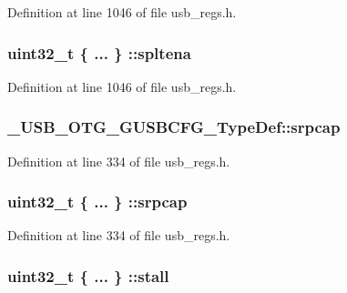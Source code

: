 Definition at line 1046 of file usb\-\_\-regs.\-h.

\hypertarget{group___u_s_b___o_t_g___d_r_i_v_e_r_ga365442084bc841784267d3f360fb62dd}{
\subsubsection[{spltena}]{\setlength{\rightskip}{0pt plus 5cm}uint32\-\_\-t \{ ... \} \-::spltena}}\label{group___u_s_b___o_t_g___d_r_i_v_e_r_ga365442084bc841784267d3f360fb62dd}


Definition at line 1046 of file usb\-\_\-regs.\-h.

\hypertarget{group___u_s_b___o_t_g___d_r_i_v_e_r_gaeaeeae32b3c77bc22a522fc15bb74658}{
\subsubsection[{srpcap}]{ \-\_\-\-U\-S\-B\-\_\-\-O\-T\-G\-\_\-\-G\-U\-S\-B\-C\-F\-G\-\_\-\-Type\-Def\-::srpcap}}\label{group___u_s_b___o_t_g___d_r_i_v_e_r_gaeaeeae32b3c77bc22a522fc15bb74658}


Definition at line 334 of file usb\-\_\-regs.\-h.

\hypertarget{group___u_s_b___o_t_g___d_r_i_v_e_r_ga08c380c4cf69e3d30809c2f866df24d7}{
\subsubsection[{srpcap}]{\setlength{\rightskip}{0pt plus 5cm}uint32\-\_\-t \{ ... \} \-::srpcap}}\label{group___u_s_b___o_t_g___d_r_i_v_e_r_ga08c380c4cf69e3d30809c2f866df24d7}


Definition at line 334 of file usb\-\_\-regs.\-h.

\hypertarget{group___u_s_b___o_t_g___d_r_i_v_e_r_ga3fe69e58742605fb25007bdfdd1a53d7}{
\subsubsection[{stall}]{\setlength{\rightskip}{0pt plus 5cm}uint32\-\_\-t \{ ... \} \-::stall}}\label{group___u_s_b___o_t_g___d_r_i_v_e_r_ga3fe69e58742605fb25007bdfdd1a53d7}


